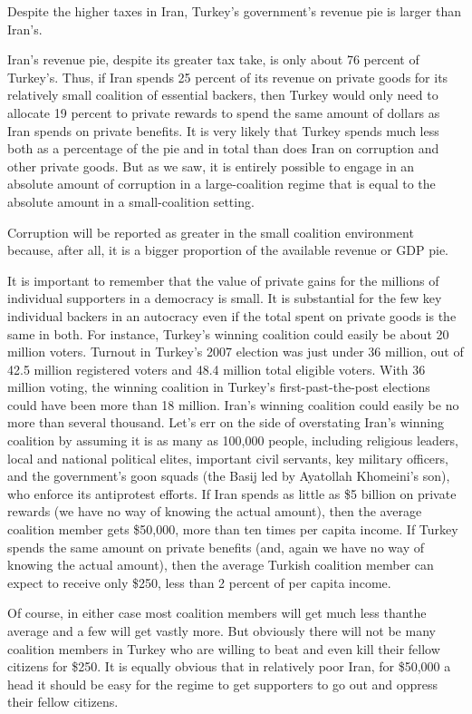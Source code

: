 \documentclass[10pt]{article}
\begin{document}
{\large Despite the higher taxes in Iran, Turkey's government's revenue pie is
larger than Iran's.}

{\large Iran's revenue pie, despite its greater tax take, is only about 76
percent of Turkey's. Thus, if Iran spends 25 percent of its revenue on private
goods for its relatively small coalition of essential backers, then Turkey would
only need to allocate 19 percent to private rewards to spend the same amount of
dollars as Iran spends on private benefits. It is very likely that Turkey spends
much less both as a percentage of the pie and in total than does Iran on
corruption and other private goods. But as we saw, it is entirely possible to
engage in an absolute amount of corruption in a large-coalition regime that is
equal to the absolute amount in a small-coalition setting.}

{\large Corruption will be reported as greater in the small coalition
environment because, after all, it is a bigger proportion of the available
revenue or GDP pie.}

{\large It is important to remember that the value of private gains for the
millions of individual supporters in a democracy is small. It is substantial for
the few key individual backers in an autocracy even if the total spent on private
goods is the same in both. For instance, Turkey's winning coalition could easily
be about 20 million voters. Turnout in Turkey's 2007 election was just under 36
million, out of 42.5 million registered voters and 48.4 million total eligible
voters. With 36 million voting, the winning coalition in Turkey's
first-past-the-post elections could have been more than 18 million. Iran's
winning coalition could easily be no more than several thousand. Let's err on the
side of overstating Iran's winning coalition by assuming it is as many as 100,000
people, including religious leaders, local and national political elites,
important civil servants, key military officers, and the government's goon squads
(the Basij led by Ayatollah Khomeini's son), who enforce its antiprotest efforts.
If Iran spends as little as \$5 billion on private rewards (we have no way of
knowing the actual amount), then the average coalition member gets \$50,000, more
than ten times per capita income. If Turkey spends the same amount on private
benefits (and, again we have no way of knowing the actual amount), then the
average Turkish coalition member can expect to receive only \$250, less than 2
percent of per capita income.}

{\large Of course, in either case most coalition members will get much less
thanthe average and a few will get vastly more. But obviously there will not be
many coalition members in Turkey who are willing to beat and even kill their
fellow citizens for \$250. It is equally obvious that in relatively poor Iran,
for \$50,000 a head it should be easy for the regime to get supporters to go out
and oppress their fellow citizens.}
\end{document}
